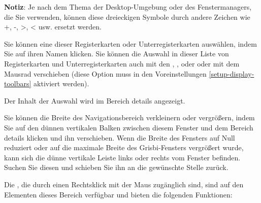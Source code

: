 
\textbf{Notiz}:  Je nach dem Thema der Desktop-Umgebung oder des Fenstermanagers, die Sie verwenden, können diese dreieckigen Symbole durch andere Zeichen wie +, -, >, < usw. ersetzt werden.%


Sie können eine dieser Registerkarten oder Unterregisterkarten auswählen, indem Sie auf ihren Namen klicken. Sie können die Auswahl in dieser Liste von Registerkarten und Unterregisterkarten auch mit den , ,  oder  oder mit dem Mausrad verschieben (diese Option muss in den Voreinstellungen \vref{setup-display-toolbars} aktiviert werden).%

Der Inhalt der Auswahl wird im Bereich details angezeigt.%


Sie können die Breite des Navigationsbereich verkleinern oder vergrößern, indem Sie auf den dünnen vertikalen Balken zwischen diesem Fenster und dem Bereich details klicken und ihn verschieben. Wenn die Breite des Fensters auf Null reduziert oder auf die maximale Breite des Grisbi-Fensters vergrößert wurde, kann sich die dünne vertikale Leiste links oder rechts vom Fenster befinden.  Suchen Sie diesen und schieben Sie ihn an die gewünschte Stelle zurück.%


Die , die durch einen Rechtsklick mit der Maus zugänglich sind, sind auf den Elementen dieses Bereich verfügbar und bieten die folgenden Funktionen:%

